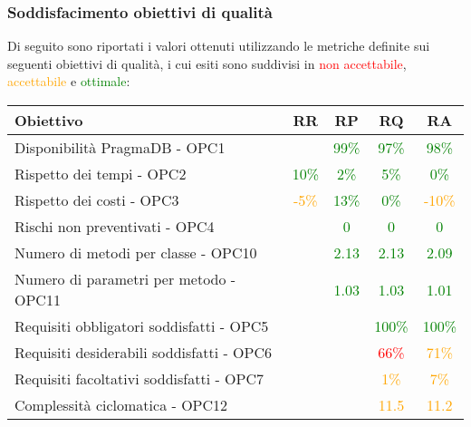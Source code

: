 \documentclass[PdQ.tex]{subfiles}
\begin{document}
\subsubsection{Soddisfacimento obiettivi di qualità}
			Di seguito sono riportati i valori ottenuti utilizzando le metriche definite sui seguenti obiettivi di qualità, i cui esiti sono suddivisi in \textcolor{red}{non accettabile}, \textcolor{orange}{accettabile} e \textcolor{green}{ottimale}:
			\begin{table}[H]
				\centering
				\begin{tabular}{l c c c c}
					\hline
					\rule[-0.3cm]{0cm}{0.8cm}
					\textbf{Obiettivo} & \textbf{RR} & \textbf{RP} & \textbf{RQ} & \textbf{RA}\\
					\hline
					\rule[0cm]{0cm}{0.4cm}
					Disponibilità PragmaDB - OPC1 & & \textcolor{green}{99\%} & \textcolor{green}{97\%} & \textcolor{green}{98\%}\\
					\rule[0cm]{0cm}{0.4cm}
					Rispetto dei tempi - OPC2 & \textcolor{green}{10\%} & \textcolor{green}{2\%} & \textcolor{green}{5\%} & \textcolor{green}{0\%} \\
					\rule[0cm]{0cm}{0.4cm}
					Rispetto dei costi - OPC3 & \textcolor{orange}{-5\%} & \textcolor{green}{13\%} & \textcolor{green}{0\%} & \textcolor{orange}{-10\%}\\
					\rule[0cm]{0cm}{0.4cm}
					Rischi non preventivati - OPC4 & & \textcolor{green}{0} & \textcolor{green}{0} & \textcolor{green}{0}\\
					\rule[0cm]{0cm}{0.4cm}
					Numero di metodi per classe - OPC10 & & \textcolor{green}{2.13} & \textcolor{green}{2.13} & \textcolor{green}{2.09} \\
					\rule[0cm]{0cm}{0.4cm}
					Numero di parametri per metodo - OPC11 & & \textcolor{green}{1.03} & \textcolor{green}{1.03} & \textcolor{green}{1.01}\\
					\rule[0cm]{0cm}{0.4cm}
					Requisiti obbligatori soddisfatti - OPC5 & & & \textcolor{green}{100\%} & \textcolor{green}{100\%}\\
					\rule[0cm]{0cm}{0.4cm}
					Requisiti desiderabili soddisfatti - OPC6 & & & \textcolor{red}{66\%} & \textcolor{orange}{71\%} \\
					\rule[0cm]{0cm}{0.4cm}
					Requisiti facoltativi soddisfatti - OPC7 & & & \textcolor{orange}{1\%} & \textcolor{orange}{7\%} \\
					\rule[0cm]{0cm}{0.4cm}
					Complessità ciclomatica - OPC12 & & & \textcolor{orange}{11.5} & \textcolor{orange}{11.2} \\

\end{tabular}
\end{table}
\end{document}
